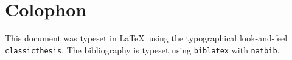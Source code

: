 \pagestyle{empty}

\hfill

\vfill



\section*{Colophon}
This document was typeset in \LaTeX~using the typographical look-and-feel
\texttt{classicthesis}. The bibliography is typeset using \texttt{biblatex} with \texttt{natbib}.
